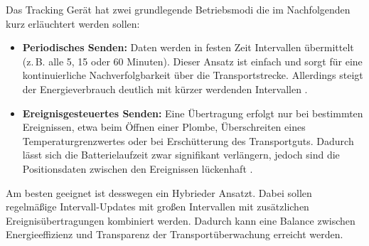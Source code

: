 Das Tracking Gerät hat zwei grundlegende Betriebsmodi die im Nachfolgenden kurz erläuchtert werden sollen:

\begin{itemize}
    \item \textbf{Periodisches Senden:} 
    Daten werden in festen Zeit Intervallen übermittelt (z.\,B. alle 5, 15 oder 60 Minuten). 
    Dieser Ansatz ist einfach und sorgt für eine kontinuierliche Nachverfolgbarkeit über die Transportstrecke. 
    Allerdings steigt der Energieverbrauch deutlich mit kürzer werdenden Intervallen \cite{lansitec2024lorawan,cloudstudio2023lorawan}.
    
    \item \textbf{Ereignisgesteuertes Senden:} 
    Eine Übertragung erfolgt nur bei bestimmten Ereignissen, etwa beim Öffnen einer Plombe, Überschreiten eines Temperaturgrenzwertes 
    oder bei Erschütterung des Transportguts. 
    Dadurch lässt sich die Batterielaufzeit zwar signifikant verlängern, jedoch sind die Positionsdaten zwischen den Ereignissen lückenhaft 
    \cite{tektelic2023assettracking,zhang2022lorawanmac}.
\end{itemize}

Am besten geeignet ist desswegen ein Hybrieder Ansatzt. Dabei sollen regelmäßige Intervall-Updates mit großen Intervallen mit zusätzlichen Ereignisübertragungen kombiniert werden. 
Dadurch kann eine Balance zwischen Energieeffizienz und Transparenz der Transportüberwachung erreicht werden.